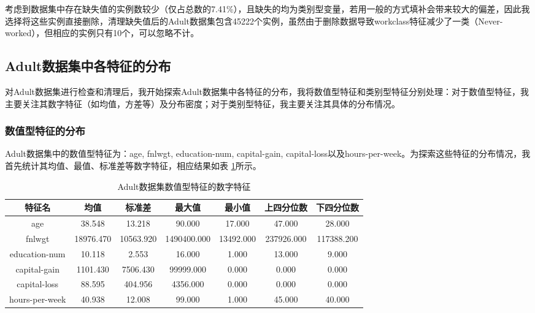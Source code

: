 \documentclass[12pt,a4paper]{article}
\theoremstyle{definition}
\begin{document}
\vspace{0.01\linewidth}
考虑到数据集中存在缺失值的实例数较少（仅占总数的7.41\%），且缺失的均为类别型变量，若用一般的方式填补会带来较大的偏差，因此我选择将这些实例直接删除，清理缺失值后的Adult数据集包含45222个实例，虽然由于删除数据导致workclass特征减少了一类（Never-worked），但相应的实例只有10个，可以忽略不计。

\subsection{Adult数据集中各特征的分布}

对Adult数据集进行检查和清理后，我开始探索Adult数据集中各特征的分布，我将数值型特征和类别型特征分别处理：对于数值型特征，我主要关注其数字特征（如均值，方差等）及分布密度；对于类别型特征，我主要关注其具体的分布情况。

\subsubsection{数值型特征的分布}
\label{sec:num_feature}

Adult数据集中的数值型特征为：age, fnlwgt, education-num, capital-gain, capital-loss以及hours-per-week。为探索这些特征的分布情况，我首先统计其均值、最值、标准差等数字特征，相应结果如表 \ref{tab:num_feature_avg}所示。

\begin{table}[H]
	\renewcommand\arraystretch{1.5}
	\caption{Adult数据集数值型特征的数字特征}
	\label{tab:num_feature_avg}
	\centering
	
	\begin{tabular}{c|c|c|c|c|c|c}
		\centering
		 特征名 &  均值 & 标准差 & 最大值 & 最小值 &  上四分位数 & 下四分位数 \\
		\hline
		\hline
		age & 38.548 & 13.218 & 90.000 & 17.000 & 47.000 & 28.000 \\
		fnlwgt & 18976.470 & 10563.920 & 1490400.000 & 13492.000 & 237926.000 & 117388.200 \\
		education-num & 10.118 & 2.553 & 16.000 & 1.000 & 13.000 & 9.000 \\
		capital-gain & 1101.430 & 7506.430 & 99999.000 & 0.000 & 0.000 & 0.000 \\
		capital-loss & 88.595 & 404.956 & 4356.000 & 0.000 & 0.000 & 0.000 \\
		hours-per-week & 40.938 & 12.008 & 99.000 & 1.000 & 45.000 & 40.000 \\

	\end{tabular}
\end{table}
\end{document}
